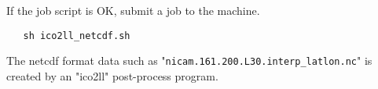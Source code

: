  \noindent If the job script is OK, submit a job to the machine.
 \begin{verbatim}
   sh ico2ll_netcdf.sh
 \end{verbatim}


 \noindent The netcdf format data such as "\verb|nicam.161.200.L30.interp_latlon.nc|"
 is created by an "ico2ll" post-process program.

